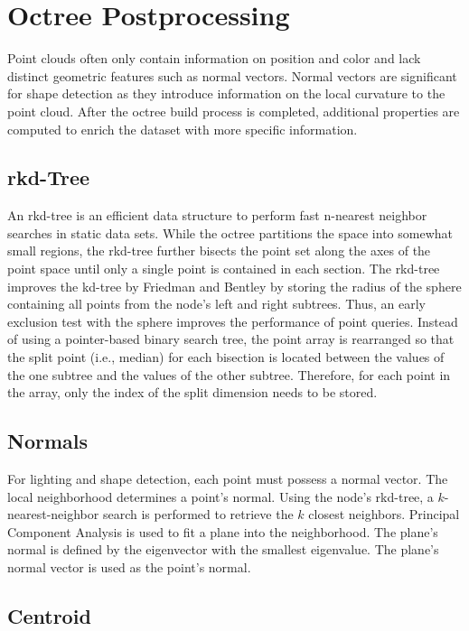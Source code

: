 \section{Octree Postprocessing}

Point clouds often only contain information on position and color and lack distinct geometric features such as normal vectors. Normal vectors are significant for shape detection as they introduce information on the local curvature to the point cloud. After the octree build process is completed, additional properties are computed to enrich the dataset with more specific information. 


\subsection{rkd-Tree}

An rkd-tree \cite{tobler2011rkd} is an efficient data structure to perform fast n-nearest neighbor searches in static data sets. While the octree partitions the space into somewhat small regions, the rkd-tree further bisects the point set along the axes of the point space until only a single point is contained in each section. The rkd-tree improves the kd-tree by Friedman and Bentley \cite{friedman1975algorithm} by storing the radius of the sphere containing all points from the node's left and right subtrees. Thus, an early exclusion test with the sphere improves the performance of point queries. Instead of using a pointer-based binary search tree, the point array is rearranged so that the split point (i.e., median) for each bisection is located between the values of the one subtree and the values of the other subtree. Therefore, for each point in the array, only the index of the split dimension needs to be stored. 


\subsection{Normals}

For lighting and shape detection, each point must possess a normal vector. The local neighborhood determines a point's normal. Using the node's rkd-tree, a $k$-nearest-neighbor search is performed to retrieve the $k$ closest neighbors. Principal Component Analysis \cite{jolliffe2002principal} is used to fit a plane into the neighborhood. The plane's normal is defined by the eigenvector with the smallest eigenvalue. The plane's normal vector is used as the point's normal.


\subsection{Centroid}

